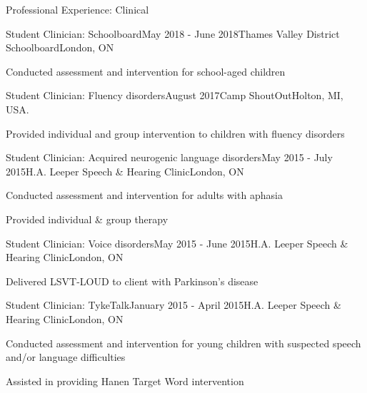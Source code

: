 \documentclass{resume} %
\begin{document}
\begin{rSection}{Professional Experience: Clinical}

	\begin{rSubsection}{Student Clinician: Schoolboard}{May 2018 - June 2018}{Thames Valley District Schoolboard}{London, ON}
	\item Conducted assessment and intervention for school-aged children
	\end{rSubsection}
	
	\begin{rSubsection}{Student Clinician: Fluency disorders}{August 2017}{Camp ShoutOut}{Holton, MI, USA.}
	\item Provided individual and group intervention to children with fluency disorders
	\end{rSubsection}
	
	
	\begin{rSubsection}{Student Clinician: Acquired neurogenic language disorders}{May 2015 - July 2015}{H.A. Leeper Speech \& Hearing Clinic}{London, ON}
	\item Conducted assessment and intervention for adults with aphasia
	\item Provided individual \& group therapy
	\end{rSubsection}
	
	
	\begin{rSubsection}{Student Clinician: Voice disorders}{May 2015 - June 2015}{H.A. Leeper Speech \& Hearing Clinic}{London, ON}
	\item Delivered LSVT-LOUD to client with Parkinson's disease
	\end{rSubsection}
	
	
	\begin{rSubsection}{Student Clinician: TykeTalk}{January 2015 - April 2015}{H.A. Leeper Speech \& Hearing Clinic}{London, ON}
	\item Conducted assessment and intervention for young children with suspected speech and/or language difficulties
	\item Assisted in providing Hanen Target Word intervention
	\end{rSubsection}
\end{rSection}
\end{document}
